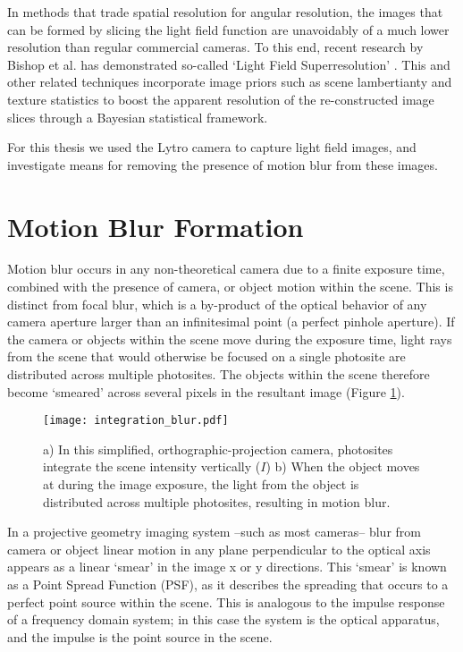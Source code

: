 In methods that trade spatial resolution for angular resolution, the images that can be formed by slicing the light field function are unavoidably of a much lower resolution than regular commercial cameras.
To this end, recent research by Bishop et al. has demonstrated so-called \enquote*{Light Field Superresolution} \cite{bishop2009light}.
This and other related techniques incorporate image priors such as scene lambertianty and texture statistics to boost the apparent resolution of the re-constructed image slices through a Bayesian statistical framework.

For this thesis we used the Lytro camera to capture light field images, and investigate means for removing the presence of motion blur from these images.

\section{Motion Blur Formation}
\label{sec:motion_blur_formation}

Motion blur occurs in any non-theoretical camera due to a finite exposure time, combined with the presence of camera, or object motion within the scene.
This is distinct from focal blur, which is a by-product of the optical behavior of any camera aperture larger than an infinitesimal point (a perfect pinhole aperture).
If the camera or objects within the scene move during the exposure time, light rays from the scene that would otherwise be focused on a single photosite are distributed across multiple photosites.
The objects within the scene therefore become \enquote*{smeared} across several pixels in the resultant image (Figure \ref{fig:integration_blur}).

\begin{figure}[h]
\centering
\texttt{[image: integration\_blur.pdf]}
\caption[Motion Blur Caused by Camera Integration]{
a) In this simplified, orthographic-projection camera, photosites integrate the scene intensity vertically ($I$) b) When the object moves at during the image exposure, the light from the object is distributed across multiple photosites, resulting in motion blur.
}
\label{fig:integration_blur}
\end{figure}

In a projective geometry imaging system --such as most cameras-- blur from camera or object linear motion in any plane perpendicular to the optical axis appears as a linear \enquote*{smear} in the image x or y directions.
This \enquote*{smear} is known as a Point Spread Function (PSF), as it describes the spreading that occurs to a perfect point source within the scene.
This is analogous to the impulse response of a frequency domain system; in this case the system is the optical apparatus, and the impulse is the point source in the scene.

